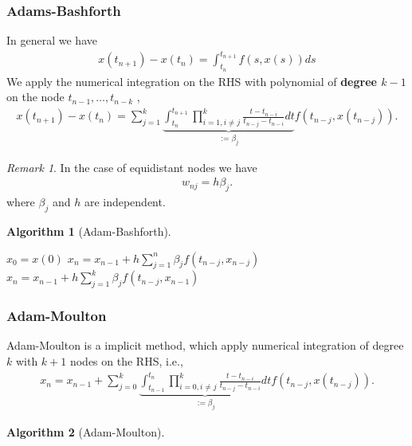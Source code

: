 \documentclass[a4paper,12pt,oneside,fleqn]{book}
\newtheorem{algorithm}{Algorithm}[section]
\theoremstyle{definition}
\theoremstyle{remark}
\newtheorem*{remark}{Remark}
\begin{document}
\subsubsection{Adams-Bashforth}
In general we have
\begin{align*}
	x(t_{n + 1}) - x(t_n) = \int_{t_n}^{t_{n + 1}} f(s, x(s))ds 
\end{align*}
We apply the numerical integration on the RHS with polynomial of \textbf{degree $k - 1$} on the node $t_{n -1}, \dots, t_{n - k}$ , 
\begin{align*}
	x(t_{n + 1}) - x(t_n) = \sum_{j = 1}^{k} \underbrace{\int_{t_n}^{t_{n + 1}} \prod_{i = 1, i \neq j}^k \frac{t - t_{n - i}}{t_{n -j} - t_{n - i}} dt}_{:= \beta_{j}}  f(t_{n - j}, x(t_{n -j})).
\end{align*}
\begin{remark}
In the case of equidistant nodes we have
\begin{align*}
	w_{nj} = h \beta_j.
\end{align*}	
where $\beta_j$ and $h$ are independent. 
\end{remark}


\begin{algorithm}[Adam-Bashforth]
\begin{algorithmic}\quad
\State $x_0 = x(0)$
\State $x_n = x_{n -1} + h\sum_{j = 1}^{n} \beta_j f(t_{n - j}, x_{n -j})$
\Else
\State $x_n = x_{n -1} + h\sum_{j = 1}^k \beta_j f(t_{n - j}, x_{n - 1})$
\EndIf
\EndFor
\end{algorithmic}	
\end{algorithm}


\subsubsection{Adam-Moulton}
Adam-Moulton is a implicit method, which apply numerical integration of degree $k$ with $k + 1$ nodes on the RHS, i.e., 
\begin{align*}
	x_n = x_{n -1} + \sum_{j = 0}^k \underbrace{\int_{t_{n -1}}^{t_n} \prod_{i = 0, i \neq j}^k \frac{t - t_{n -i}}{t_{n -j} - t_{n - i}} dt}_{:= \beta_{j}} f(t_{n - j}, x(t_{n -j})).
\end{align*}


\begin{algorithm}[Adam-Moulton]
\end{algorithm}
\end{document}

